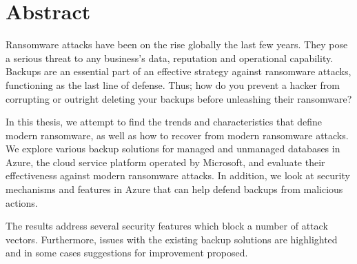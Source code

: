 \chapter*{Abstract}

Ransomware attacks have been on the rise globally the last few years. They pose a serious threat to any business's data, reputation and operational capability.
Backups are an essential part of an effective strategy against ransomware attacks, 
functioning as the last line of defense.
Thus; how do you prevent a hacker from corrupting or outright deleting your backups 
before unleashing their ransomware?

In this thesis, we attempt to find the trends and characteristics that define modern ransomware,
as well as how to recover from modern ransomware attacks.
We explore various backup solutions for managed and unmanaged 
databases in Azure, the cloud service platform operated by Microsoft, and evaluate their effectiveness against modern ransomware attacks.
In addition, we look at security mechanisms and features in Azure that can help defend
backups from malicious actions.

The results address several security features which block a number of attack vectors. Furthermore, issues with the existing backup solutions are highlighted and in some cases suggestions for improvement proposed.